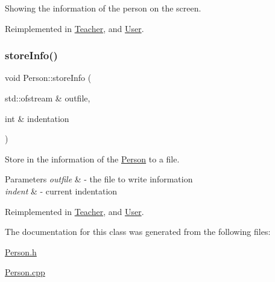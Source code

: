Showing the information of the person on the screen. 



Reimplemented in \mbox{\hyperlink{class_teacher_a3045744c4ef7e1189caac2ae9a126254}{Teacher}}, and \mbox{\hyperlink{class_user_ac8a201055d02b313721e56c4c0f6af82}{User}}.

\mbox{\label{class_person_a80f87df3f644706c2ad8fc8b800fdd95}} 
\subsubsection{\texorpdfstring{store\+Info()}{storeInfo()}}
{\footnotesize\ttfamily void Person\+::store\+Info (\begin{DoxyParamCaption}\item[{std\+::ofstream \&}]{outfile,  }\item[{int \&}]{indentation }\end{DoxyParamCaption})\hspace{0.3cm}{\ttfamily [virtual]}}



Store in the information of the \mbox{\hyperlink{class_person}{Person}} to a file. 


\begin{DoxyParams}{Parameters}
{\em outfile} & -\/ the file to write information \\
\hline
{\em indent} & -\/ current indentation \\
\hline
\end{DoxyParams}


Reimplemented in \mbox{\hyperlink{class_teacher_a2ece0d60fa7ec4aaf93333aa0be0d25f}{Teacher}}, and \mbox{\hyperlink{class_user_aac5ff0f6899f3ce56d1b2d12ed557c79}{User}}.



The documentation for this class was generated from the following files\+:\begin{DoxyCompactItemize}
\item 
\mbox{\hyperlink{_person_8h}{Person.\+h}}\item 
\mbox{\hyperlink{_person_8cpp}{Person.\+cpp}}\end{DoxyCompactItemize}
